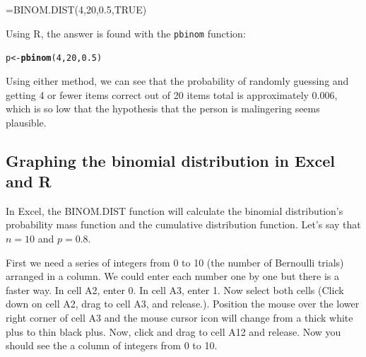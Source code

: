 \documentclass[nohyper,justified,marginals=raggedright]{tufte-book}\usepackage[]{graphicx}\usepackage[]{color}
\makeatletter
\newcommand{\hlnum}[1]{\textcolor[rgb]{0.686,0.059,0.569}{#1}}%
\newcommand{\hlstd}[1]{\textcolor[rgb]{0.345,0.345,0.345}{#1}}%
\newcommand{\hlkwb}[1]{\textcolor[rgb]{0.69,0.353,0.396}{#1}}%
\newcommand{\hlkwd}[1]{\textcolor[rgb]{0.737,0.353,0.396}{\textbf{#1}}}%
\newenvironment{kframe}{%
 \def\at@end@of@kframe{}%
 \ifinner\ifhmode%
  \def\at@end@of@kframe{\end{minipage}}%
  \begin{minipage}{\columnwidth}%
 \fi\fi%
 \def\FrameCommand##1{\hskip\@totalleftmargin \hskip-\fboxsep
 \colorbox{shadecolor}{##1}\hskip-\fboxsep
     \hskip-\linewidth \hskip-\@totalleftmargin \hskip\columnwidth}%
 \MakeFramed {\advance\hsize-\width
   \@totalleftmargin\z@ \linewidth\hsize
   \@setminipage}}%
 {\par\unskip\endMakeFramed%
 \at@end@of@kframe}
\newenvironment{knitrout}{}{} %
\makeatother
\begin{document}
\textsf{=BINOM.DIST(4,20,0.5,TRUE})

Using R, the answer is found with the \texttt{pbinom} function:
\begin{knitrout}
\color{fgcolor}\begin{kframe}
\begin{alltt}
\hlstd{p} \hlkwb{<-} \hlkwd{pbinom}\hlstd{(}\hlnum{4}\hlstd{,} \hlnum{20}\hlstd{,} \hlnum{0.5}\hlstd{)}
\end{alltt}
\end{kframe}
\end{knitrout}

Using either method, we can see that the probability of randomly guessing and getting 4 or fewer items correct out of 20 items total is approximately $0.006$, which is so low that the hypothesis that the person is malingering seems plausible.

\subsection{Graphing the binomial distribution in Excel and R}

In Excel, the \textsf{BINOM.DIST} function will calculate the binomial distribution's probability mass function and the cumulative distribution function. Let's say that $n=10$ and $p=0.8$. 

First we need a series of integers from 0 to 10 (the number of Bernoulli trials) arranged in a column.  We could enter each number one by one but there is a faster way. In cell \textsf{A2}, enter 0. In cell \textsf{A3}, enter 1. Now select both cells (Click down on cell \textsf{A2}, drag to cell \textsf{A3}, and release.). Position the mouse over the lower right corner of cell \textsf{A3} and the mouse cursor icon will change from a thick white plus to thin black plus. Now, click and drag to cell \textsf{A12} and release. Now you should see the a column of integers from 0 to 10.
\end{document}
